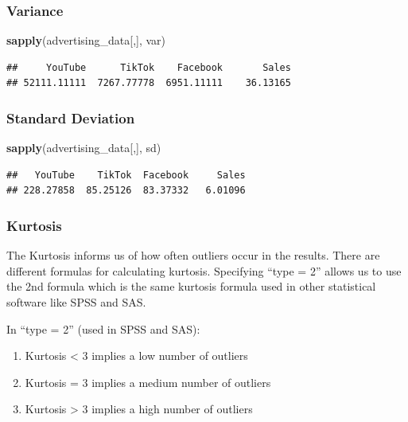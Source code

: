 \documentclass[
]{article}
\newenvironment{Shaded}{\begin{snugshade}}{\end{snugshade}}
\newcommand{\FunctionTok}[1]{\textcolor[rgb]{0.13,0.29,0.53}{\textbf{#1}}}
\newcommand{\NormalTok}[1]{#1}
\begin{document}
\subsubsection{\texorpdfstring{\textbf{Variance}}{Variance}}\label{variance}

\begin{Shaded}
\begin{Highlighting}[]
\FunctionTok{sapply}\NormalTok{(advertising\_data[,], var)}
\end{Highlighting}
\end{Shaded}

\begin{verbatim}
##     YouTube      TikTok    Facebook       Sales 
## 52111.11111  7267.77778  6951.11111    36.13165
\end{verbatim}

\subsubsection{\texorpdfstring{\textbf{Standard
Deviation}}{Standard Deviation}}\label{standard-deviation}

\begin{Shaded}
\begin{Highlighting}[]
\FunctionTok{sapply}\NormalTok{(advertising\_data[,], sd)}
\end{Highlighting}
\end{Shaded}

\begin{verbatim}
##   YouTube    TikTok  Facebook     Sales 
## 228.27858  85.25126  83.37332   6.01096
\end{verbatim}

\subsubsection{\texorpdfstring{\textbf{Kurtosis}}{Kurtosis}}\label{kurtosis}

The Kurtosis informs us of how often outliers occur in the results.
There are different formulas for calculating kurtosis. Specifying ``type
= 2'' allows us to use the 2nd formula which is the same kurtosis
formula used in other statistical software like SPSS and SAS.

In ``type = 2'' (used in SPSS and SAS):

\begin{enumerate}
\def\labelenumi{\arabic{enumi}.}
\item
  Kurtosis \textless{} 3 implies a low number of outliers
\item
  Kurtosis = 3 implies a medium number of outliers
\item
  Kurtosis \textgreater{} 3 implies a high number of outliers
\end{enumerate}
\end{document}
